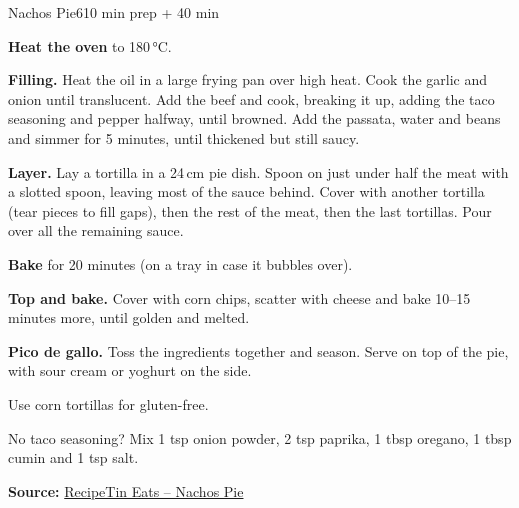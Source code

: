 \begin{recipebox}{Nachos Pie}{6}{10 min prep + 40 min}
\begin{method}
  \item \textbf{Heat the oven} to 180\,°C.
  \item \textbf{Filling.} Heat the oil in a large frying pan over high heat. Cook the
        garlic and onion until translucent. Add the beef and cook, breaking it up,
        adding the taco seasoning and pepper halfway, until browned. Add the passata,
        water and beans and simmer for 5 minutes, until thickened but still saucy.
  \item \textbf{Layer.} Lay a tortilla in a 24\,cm pie dish. Spoon on just under half
        the meat with a slotted spoon, leaving most of the sauce behind. Cover with
        another tortilla (tear pieces to fill gaps), then the rest of the meat, then
        the last tortillas. Pour over all the remaining sauce.
  \item \textbf{Bake} for 20 minutes (on a tray in case it bubbles over).
  \item \textbf{Top and bake.} Cover with corn chips, scatter with cheese and bake 10--15
        minutes more, until golden and melted.
  \item \textbf{Pico de gallo.} Toss the ingredients together and season. Serve on top
        of the pie, with sour cream or yoghurt on the side.
\end{method}

\begin{notelist}
  \item Use corn tortillas for gluten-free.
  \item No taco seasoning? Mix 1 tsp onion powder, 2 tsp paprika, 1 tbsp oregano,
        1 tbsp cumin and 1 tsp salt.
\end{notelist}

\noindent\textbf{Source:} \href{https://www.recipetineats.com/nachos-pie/}{RecipeTin Eats -- Nachos Pie}

\end{recipebox}
